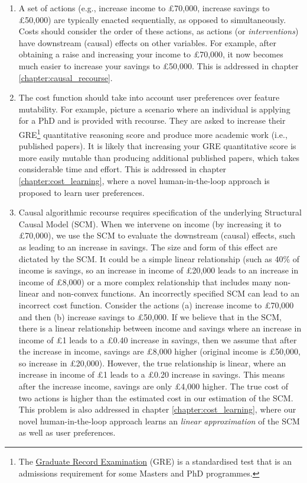 \begin{enumerate}
	\item A set of actions (e.g., increase income to £70,000, increase savings to £50,000) are typically enacted sequentially, as opposed to simultaneously. Costs should consider the order of these actions, as actions (or \textit{interventions}) have downstream (causal) effects on other variables. For example, after obtaining a raise and increasing your income to £70,000, it now becomes much easier to increase your savings to £50,000. This is addressed in chapter \ref{chapter:causal_recourse}.
	
	\item The cost function should take into account user preferences over feature mutability. For example, picture a scenario where an individual is applying for a PhD and is provided with recourse. They are asked to increase their GRE\footnote{The \href{https://www.ets.org/gre.html}{Graduate Record Examination} (GRE) is a standardised test that is an admissions requirement for some Masters and PhD programmes.} quantitative reasoning score and produce more academic work (i.e., published papers). It is likely that increasing your GRE quantitative score is more easily mutable than producing additional published papers, which takes considerable time and effort. This is addressed in chapter \ref{chapter:cost_learning}, where a novel human-in-the-loop approach is proposed to learn user preferences.
	
	\item Causal algorithmic recourse requires specification of the underlying Structural Causal Model (SCM). When we intervene on income (by increasing it to £70,000), we use the SCM to evaluate the downstream (causal) effects, such as leading to an increase in savings. The size and form of this effect are dictated by the SCM. It could be a simple linear relationship (such as 40\% of income is savings, so an increase in income of £20,000 leads to an increase in income of £8,000) or a more complex relationship that includes many non-linear and non-convex functions. An incorrectly specified SCM can lead to an incorrect cost function. Consider the actions (a) increase income to £70,000 and then (b) increase savings to £50,000. If we believe that in the SCM, there is a linear relationship between income and savings where an increase in income of £1 leads to a £0.40 increase in savings, then we assume that after the increase in income, savings are £8,000 higher (original income is £50,000, so increase in £20,000). However, the true relationship is linear, where an increase in income of £1 leads to a £0.20 increase in savings. This means after the increase income, savings are only £4,000 higher. The true cost of two actions is higher than the estimated cost in our estimation of the SCM. This problem is also addressed in chapter \ref{chapter:cost_learning}, where our novel human-in-the-loop approach learns an \textit{linear approximation} of the SCM as well as user preferences.
	
	
\end{enumerate}


